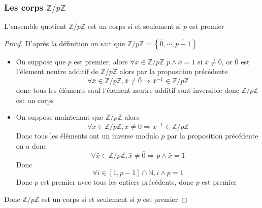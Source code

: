 \documentclass[11pt,colorlinks]{book}
\theoremstyle{mytheoremstyle}
\theoremstyle{mytheoremstyle}
\theoremstyle{mytheoremstyle}
\theoremstyle{mytheoremstyle}
\theoremstyle{mytheoremstyle}
\theoremstyle{mytheoremstyle}
\theoremstyle{mytheoremstyle}
\theoremstyle{mytheoremstyle}
\theoremstyle{myproblemstyle}
\def\mbb#1{\mathbb{#1}}
\def\bN{\mbb{N}}
\def\bZ{\mbb{Z}}
\begin{document}
\subsubsection{Les corps $\bZ/p\bZ$}
\begin{theorem}
  L'ensemble quotient $\bZ/p\bZ$ est un corps si et seulement si $p$ est premier
  \begin{proof}
    D'après la définition on sait que $\bZ/p\bZ = \left\{\bar{0},\cdots,\bar{p-1}\right\}$
    \begin{itemize}
      \item On suppose que $p$ est premier, alors $\forall \bar{x} \in \bZ/p\bZ$ $p \wedge \bar{x} = 1$ si $\bar{x} \not= \bar{0}$, or 
      $\bar{0}$ est l'élement neutre additif de $\bZ/p\bZ$ alors par la proposition précédente
      \begin{equation*}
        \forall \bar{x} \in \bZ/p\bZ, \bar{x} \not= \bar{0} \Rightarrow \bar{x}^{-1} \in \bZ/p\bZ 
      \end{equation*}
      donc tous les éléments sauf l'élement neutre additif sont inversible donc $\bZ/p\bZ$ est un corps
      \item On suppose maintenant que $\bZ/p\bZ$ alors
      \begin{equation*}
        \forall \bar{x} \in \bZ/p\bZ, \bar{x} \not= \bar{0} \Rightarrow \bar{x}^{-1} \in \bZ/p\bZ
      \end{equation*}
      Donc tous les éléments ont un inverse modulo $p$ par la proposition précédente on a donc 
      \begin{equation*}
        \forall \bar{x} \in \bZ/p\bZ, \bar{x} \not= \bar{0} \Rightarrow p \wedge \bar{x} = 1 
      \end{equation*}
      Donc 
      \begin{equation*}
        \forall i \in [1,p-1] \cap \bN, i \wedge p = 1
      \end{equation*}
      Donc $p$ est premier avec tous les entiers précédents, donc $p$ est premier
    \end{itemize}
    Donc $\bZ/p\bZ$ est un corps si et seulement si $p$ est premier
  \end{proof}
\end{theorem}
\end{document}
